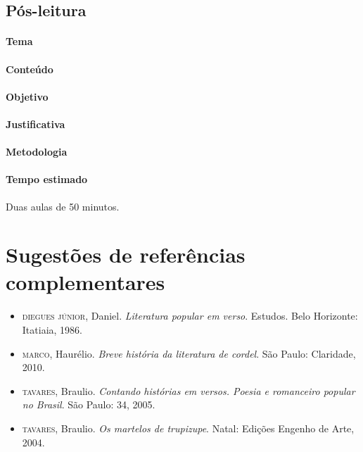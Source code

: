 \documentclass[11pt]{extarticle}
\begin{document}
\subsection{Pós-leitura}


\paragraph{Tema}

\paragraph{Conteúdo}

\paragraph{Objetivo}

\paragraph{Justificativa}


\paragraph{Metodologia}

\paragraph{Tempo estimado} Duas aulas de 50 minutos.


\section{Sugestões de referências complementares}


\begin{itemize}
\item \textsc{diegues júnior}, Daniel. \textit{Literatura popular em verso}. Estudos. Belo Horizonte: Itatiaia, 1986. 

\item \textsc{marco}, Haurélio. \textit{Breve história da literatura de cordel}. São Paulo: Claridade, 2010.

\item \textsc{tavares}, Braulio. \textit{Contando histórias em versos. Poesia e romanceiro popular no Brasil}. São Paulo: 34, 2005.

\item \textsc{tavares}, Braulio. \textit{Os martelos de trupizupe}. Natal: Edições Engenho de Arte, 2004.
\end{itemize}
\end{document}
